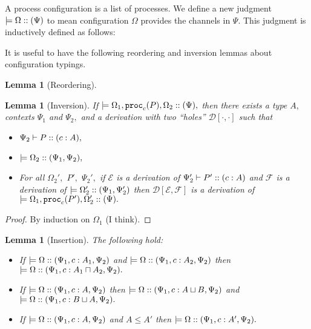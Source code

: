 \documentclass[11pt]{article}
\theoremstyle{plain}
\newtheorem{lemma}[theorem]{Lemma}
\theoremstyle{definition}
\theoremstyle{remark}
\DeclarePairedDelimiter\parens{(}{)}             %
\newcommand{\DD}{\mathcal{D}}
\newcommand{\EE}{\mathcal{E}}
\newcommand{\FF}{\mathcal{F}}
\newcommand\sub{\le}
\newcommand\intersect{\mathbin{\sqcap}}
\newcommand\union{\mathbin{\sqcup}}
\newcommand\irb[1]{\texttt{#1}}
\newcommand{\ctx}{\Psi}
\newcommand{\config}{\Omega}
\newcommand\typeProc[3]{#1 :: \parens{#2 : #3}}
\newcommand\typeS[4]{#1 \vdash \typeProc{#2}{#3}{#4}}
\newcommand\proc[2]{\irb{proc}_{#1}\parens{#2}}
\newcommand\provides[2]{\models #1 :: \parens{#2}}
\begin{document}
A process configuration is a list of processes. We define a new judgment $\provides{\Omega}{\ctx}$ to mean configuration $\Omega$ provides the channels in $\ctx.$ This judgment is inductively defined as follows:


It is useful to have the following reordering and inversion lemmas about configuration typings.

\begin{lemma}[Reordering]
  \label{config-reorder}
\end{lemma}

\begin{lemma}[Inversion]
  \label{config-invert}
  If $\provides{\Omega_1, \proc c P, \Omega_2}{\ctx},$ then there exists a type $A,$ contexts $\ctx_1$ and $\ctx_2,$ and a derivation with two ``holes'' $\DD[\cdot, \cdot]$ such that
  \begin{itemize}
    \item $\typeS{\ctx_2}{P}{c}{A},$
    \item $\provides{\Omega_2}{\ctx_1, \ctx_2},$
    \item For all $\Omega_2',$ $P',$ $\ctx_2',$ if $\EE$ is a derivation of $\typeS{\ctx_2'}{P'}{c}{A}$ and $\FF$ is a derivation of $\provides{\Omega_2'}{\ctx_1, \ctx_2'}$ then $\DD[\EE, \FF]$ is a derivation of $\provides{\Omega_1, \proc{c}{P'}, \Omega_2'}{\ctx}.$
  \end{itemize}
\end{lemma}
\begin{proof}
By induction on $\config_1$ (I think).
\end{proof}

\begin{lemma}[Insertion]
  \label{config-insert}
  The following hold:
  \begin{itemize}
    \item If $\provides{\config}{\ctx_1, c : A_1, \ctx_2}$ and $\provides{\config}{\ctx_1, c : A_2, \ctx_2}$ then $\provides{\config}{\ctx_1, c : A_1 \intersect A_2, \ctx_2}.$
    \item If $\provides{\config}{\ctx_1, c : A, \ctx_2}$ then $\provides{\config}{\ctx_1, c : A \union B, \ctx_2}$ and $\provides{\config}{\ctx_1, c : B \union A, \ctx_2}.$
    \item If $\provides{\config}{\ctx_1, c : A, \ctx_2}$ and $A \sub A'$ then $\provides{\config}{\ctx_1, c : A', \ctx_2}.$
  \end{itemize}

\end{lemma}
\end{document}
